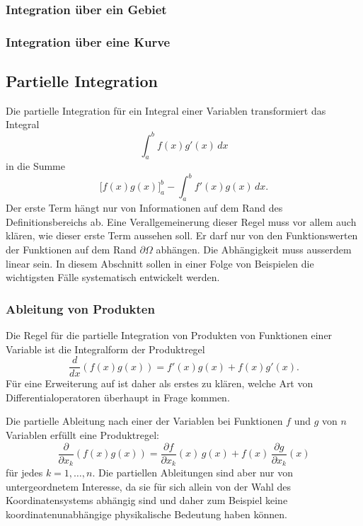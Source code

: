 %
%
\subsubsection{Integration über ein Gebiet}

%
%
\subsubsection{Integration über eine Kurve}

%
%
\subsection{Partielle Integration}
Die partielle Integration für ein Integral einer Variablen
transformiert das Integral
\[
\int_{a}^{b} f(x) g'(x)\,dx
\]
in die Summe
\[
\biggl[ f(x) g(x) \biggr]_a^b
-
\int_a^b f'(x) g(x)\,dx.
\]
Der erste Term hängt nur von Informationen auf dem Rand des 
Definitionsbereichs ab.
Eine Verallgemeinerung dieser Regel muss vor allem auch klären,
wie dieser erste Term aussehen soll.
Er darf nur von den Funktionswerten der Funktionen auf dem Rand
$\partial\Omega$ abhängen.
Die Abhängigkeit muss ausserdem linear sein.
In diesem Abschnitt sollen in einer Folge von Beispielen die
wichtigsten Fälle systematisch entwickelt werden.

%
%
\subsubsection{Ableitung von Produkten}
Die Regel für die partielle Integration von Produkten von Funktionen
einer Variable ist die Integralform der Produktregel
\[
\frac{d}{dx}(f(x)g(x)) = f'(x)g(x) + f(x)g'(x).
\]
Für eine Erweiterung auf ist daher als erstes zu klären, welche Art
von Differentialoperatoren überhaupt in Frage kommen.

Die partielle Ableitung nach einer der Variablen bei Funktionen
$f$ und $g$ von $n$ Variablen erfüllt eine Produktregel:
\[
\frac{\partial}{\partial x_k}
(f(x)g(x))
=
\frac{\partial f}{\partial x_k}(x)\,g(x)
+
f(x)
\,
\frac{\partial g}{\partial x_k}(x)
\]
für jedes $k=1,\dots,n$.
Die partiellen Ableitungen sind aber nur von untergeordnetem Interesse,
da sie für sich allein von der Wahl des Koordinatensystems abhängig 
sind und daher zum Beispiel keine koordinatenunabhängige physikalische
Bedeutung haben können.

